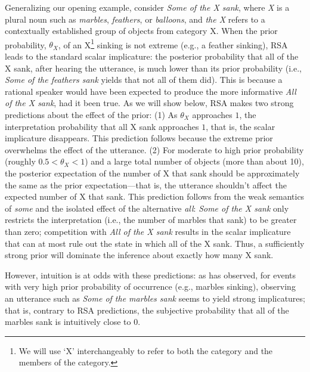 \documentclass[10pt,letterpaper]{article}
\begin{document}
Generalizing our opening example, consider \emph{Some of the X sank}, where \emph{X} is a plural noun such as \emph{marbles}, \emph{feathers}, or \emph{balloons}, and \emph{the X} refers to a contextually established group of objects from category X. When the prior probability, $\theta_{X}$, of an X\footnote{We will use `X' interchangeably to refer to both the category and the members of the category.} sinking is not extreme (e.g., a feather sinking), RSA leads to the standard scalar implicature: the posterior probability that all of the X sank, after hearing the utterance, is much lower than its prior probability (i.e., \emph{Some of the feathers sank} yields that not all of them did). This is because a rational speaker would have been expected to produce the more informative \emph{All of the X sank}, had it been true.
As we will show below, RSA makes two strong predictions about the effect of the prior: (1) As $\theta_{X}$ approaches $1$, the interpretation probability that all X sank approaches $1$, that is, the scalar implicature disappears. 
This prediction follows because the extreme prior overwhelms the effect of the utterance.
(2) For moderate to high prior probability (roughly $0.5{<}\theta_{X}{<}1$) and a large total number of objects (more than about 10), the posterior expectation of the number of X that sank should be approximately the same as the prior expectation---that is, the utterance shouldn't affect the expected number of X that sank. 
%
This prediction follows from the weak semantics of \emph{some} and the isolated effect of the alternative \emph{all}: \emph{Some of the X sank} only restricts the interpretation (i.e., the number of marbles that sank) to be greater than zero; competition with \emph{All of the X sank} results in the scalar implicature that can at most rule out the state in which all of the X sank. Thus, a sufficiently strong prior will dominate the inference about exactly how many X sank.



However, intuition is at odds with these predictions: as  has observed, for events with very high prior probability of occurrence (e.g., marbles sinking), observing an utterance such as \emph{Some of the marbles sank} seems to yield strong implicatures; that is, contrary to RSA predictions, the subjective probability that all of the marbles sank is intuitively close to 0. 
%
\end{document}
